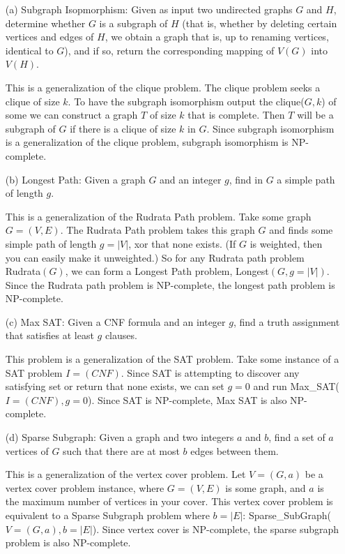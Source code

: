 \documentclass[11pt]{article}
\begin{document}
\begin{itemize}

\item[(a)] Subgraph Isopmorphism: Given as input two undirected graphs $G$
  and $H$, determine whether $G$ is a subgraph of $H$ (that is, whether by 
  deleting certain vertices and edges of $H$, we obtain a graph that is,
  up to renaming vertices, identical to $G$), and if so, return the
  corresponding mapping of $V(G)$ into $V(H)$.

  This is a generalization of the clique problem. The clique problem
  seeks a clique of size $k$.
  To have the subgraph isomorphism output the clique($G,k$) of some 
  we can construct a graph $T$ of size $k$ that is complete. Then $T$ 
  will be a subgraph of $G$ if there is a clique of size $k$ in $G$. Since 
  subgraph isomorphism is a generalization of the clique problem, 
  subgraph isomorphism is NP-complete.

\item[(b)] Longest Path: Given a graph $G$ and an integer $g$, find in $G$ 
  a simple path of length $g$.

  This is a generalization of the Rudrata Path problem. Take some
  graph $G=(V,E)$. The Rudrata Path problem takes this graph $G$ and 
  finds some simple path of length $g=|V|$, xor that none exists.
  (If $G$ is weighted, then you 
  can easily make it unweighted.) So for any Rudrata path problem Rudrata$(G)$,
  we can form a Longest Path problem, Longest$(G,g=|V|)$. Since the 
  Rudrata path problem is NP-complete, the
  longest path problem is NP-complete.

\item[(c)] Max SAT: Given a CNF formula and an integer $g$, find a truth 
  assignment that satisfies at least $g$ clauses. 

  This problem is a generalization of the SAT problem.  Take some instance
  of a SAT problem $I=(CNF)$. Since SAT is attempting to discover any 
  satisfying set or return that none exists, 
  we can set $g=0$ and run Max\_SAT($I=(CNF),g=0$). Since SAT is NP-complete, 
  Max SAT is also NP-complete.

\item[(d)] Sparse Subgraph: Given a graph and two integers $a$ and $b$, 
  find a set of $a$ vertices of $G$ such that there are at most $b$ edges
  between them.

  This is a generalization of the vertex cover problem. Let $V=(G,a)$ be 
  a vertex cover problem instance, where $G=(V,E)$ is some graph, and
  $a$ is the maximum number of vertices in your cover.
  This vertex cover 
  problem is equivalent to a Sparse Subgraph problem where $b=|E|$: 
  Sparse\_SubGraph($V=(G,a),b=|E|$). Since vertex cover is NP-complete,
  the sparse subgraph problem is also NP-complete.
  
\end{itemize}
\end{document}
